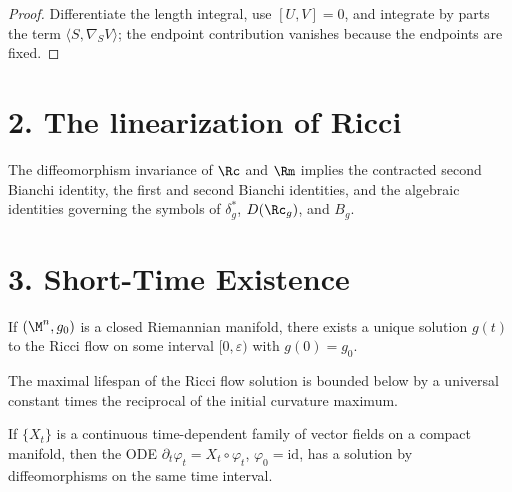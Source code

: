 \begin{proof}
\sketch Differentiate the length integral, use \([U,V]=0\), and integrate by parts the term \(\langle S,\nabla_S V\rangle\); the endpoint contribution vanishes because the endpoints are fixed.
\end{proof}

\section*{2. The linearization of Ricci}

\begin{remark}
\label{ch03-rem-symbol-of-composition}

The diffeomorphism invariance of \(\Rc\) and \(\Rm\) implies the contracted second Bianchi identity, the first and second Bianchi identities, and the algebraic identities governing the symbols of \(\delta_g^*\), \(D(\Rc_g)\), and \(B_g\).
\end{remark}

\section*{3. Short-Time Existence}

\begin{theorem}
\label{ch03-thm-short-time-existence}

If \((\M^n,g_0)\) is a closed Riemannian manifold, there exists a unique solution \(g(t)\) to the Ricci flow on some interval \([0,\varepsilon)\) with \(g(0)=g_0\).
\end{theorem}

\begin{remark}
\label{ch03-rem-lifetime-lower-bound}

The maximal lifespan of the Ricci flow solution is bounded below by a universal constant times the reciprocal of the initial curvature maximum.
\end{remark}

\begin{lemma}
\label{ch03-lem-deTurck-flow-diffeomorphisms}

If \(\{X_t\}\) is a continuous time-dependent family of vector fields on a compact manifold, then the ODE \(\partial_t\varphi_t=X_t\circ\varphi_t\), \(\varphi_0=\mathrm{id}\), has a solution by diffeomorphisms on the same time interval.
\end{lemma}

